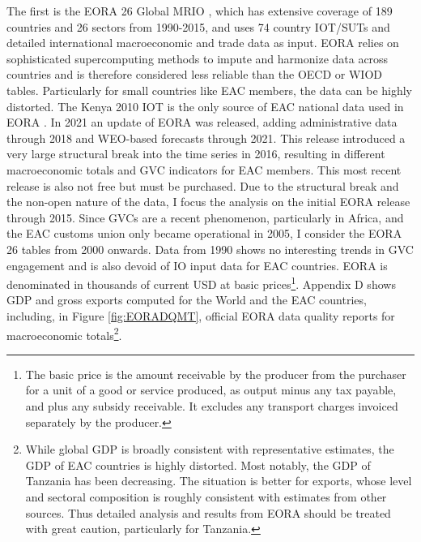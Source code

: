 \documentclass[a4paper]{article}
\begin{document}
 The first is the EORA 26 Global MRIO \citep{lenzen2012mapping, lenzen2013building}, which has extensive coverage of 189 countries and 26 sectors from 1990-2015, and uses 74 country IOT/SUTs and detailed international macroeconomic and trade data as input. EORA relies on sophisticated supercomputing methods to impute and harmonize data across countries and is therefore considered less reliable than the OECD or WIOD tables. Particularly for small countries like EAC members, the data can be highly distorted. The Kenya 2010 IOT is the only source of EAC national data used in EORA \citep{lenzen2013building}. In 2021 an update of EORA was released, adding administrative data through 2018 and WEO-based forecasts through 2021. This release introduced a very large structural break into the time series in 2016, resulting in different macroeconomic totals and GVC indicators for EAC members. %
This most recent release is also not free but must be purchased. Due to the structural break and the non-open nature of the data, I focus the analysis on the initial EORA release through 2015. Since GVCs are a recent phenomenon, particularly in Africa, and the EAC customs union only became operational in 2005, I consider the EORA 26 tables from 2000 onwards. Data from 1990 shows no interesting trends in GVC engagement and is also devoid of IO input data for EAC countries. %
EORA is denominated in thousands of current USD at basic prices\footnote{The basic price is the amount receivable by the producer from the purchaser for a unit of a good or service produced, as output minus any tax payable, and plus any subsidy receivable. It excludes any transport charges invoiced separately by the producer.}. %
Appendix D shows GDP and gross exports computed for the World and the EAC countries, including, in Figure \ref{fig:EORADQMT}, official EORA data quality reports for macroeconomic totals\footnote{While global GDP is broadly consistent with representative estimates, the GDP of EAC countries is highly distorted. Most notably, the GDP of Tanzania has been decreasing. The situation is better for exports, whose level and sectoral composition is roughly consistent with estimates from other sources. Thus detailed analysis and results from EORA should be treated with great caution, particularly for Tanzania.}. %
\end{document}
